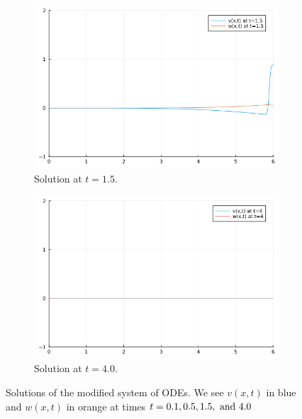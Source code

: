 \documentclass[12pt]{report}
\begin{document}
\begin{solution}
\begin{figure}[H]
\begin{subfigure}[b]{0.45\linewidth}
        \includegraphics[width=\linewidth]{images/4-3.png}
        \caption{Solution at $t=1.5$.}
        \label{4sol:c}
        \vspace{4ex}
    \end{subfigure}%
    \begin{subfigure}[b]{0.45\linewidth}
        \centering
        \includegraphics[width=\linewidth]{images/4-4.png}
        \caption{Solution at $t=4.0$.}
        \label{4sol:d}
        \vspace{4ex}
    \end{subfigure}
    \caption{Solutions of the modified system of ODEs. We see $v(x,t)$ in blue and $w(x,t)$ in orange at times $t=0.1,0.5,1.5,{~\text{and}~} 4.0$}
    \label{4sol}
\end{figure}

\end{solution}
\end{document}
